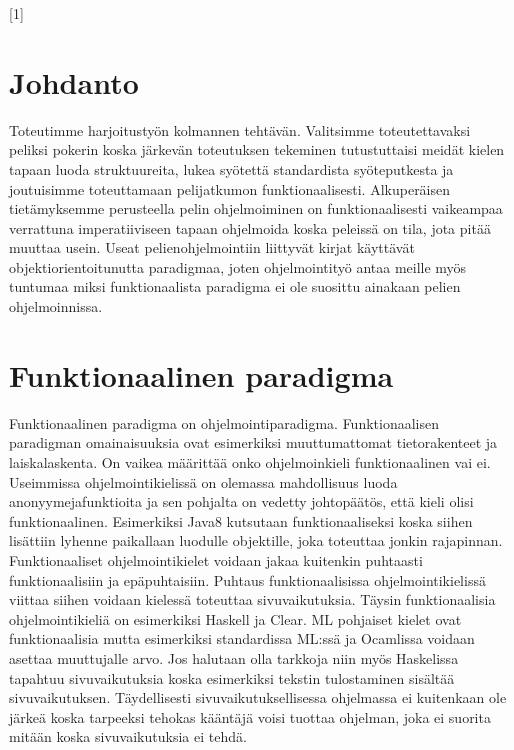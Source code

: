 \documentclass[12pt]{article}
\begin{document}
[1]
{}
{}
% 

\maketitle
\section{Johdanto}
Toteutimme harjoitustyön kolmannen tehtävän.
Valitsimme toteutettavaksi peliksi pokerin koska järkevän toteutuksen tekeminen tutustuttaisi meidät kielen tapaan luoda struktuureita,
lukea syötettä standardista syöteputkesta ja joutuisimme toteuttamaan pelijatkumon funktionaalisesti. Alkuperäisen tietämyksemme perusteella pelin ohjelmoiminen on funktionaalisesti vaikeampaa verrattuna imperatiiviseen tapaan ohjelmoida koska peleissä on tila, jota pitää muuttaa usein. Useat pelienohjelmointiin liittyvät kirjat käyttävät objektiorientoitunutta paradigmaa, joten ohjelmointityö antaa meille myös tuntumaa miksi funktionaalista paradigma ei ole suosittu ainakaan pelien ohjelmoinnissa.

\section{Funktionaalinen paradigma}
Funktionaalinen paradigma on ohjelmointiparadigma. Funktionaalisen paradigman omainaisuuksia ovat esimerkiksi muuttumattomat tietorakenteet ja laiskalaskenta.
On vaikea määrittää onko ohjelmoinkieli funktionaalinen vai ei. Useimmissa ohjelmointikielissä on olemassa mahdollisuus luoda anonyymejafunktioita ja sen pohjalta on vedetty johtopäätös, että kieli olisi funktionaalinen. Esimerkiksi Java8 kutsutaan funktionaaliseksi koska siihen lisättiin lyhenne paikallaan luodulle objektille, joka toteuttaa jonkin rajapinnan.
Funktionaaliset ohjelmointikielet voidaan jakaa kuitenkin puhtaasti funktionaalisiin ja epäpuhtaisiin. Puhtaus funktionaalisissa ohjelmointikielissä viittaa siihen voidaan kielessä toteuttaa sivuvaikutuksia. 
Täysin funktionaalisia ohjelmointikieliä on esimerkiksi Haskell ja Clear. ML pohjaiset kielet ovat funktionaalisia mutta esimerkiksi standardissa ML:ssä ja Ocamlissa voidaan asettaa muuttujalle arvo.
Jos halutaan olla tarkkoja niin myös Haskelissa tapahtuu sivuvaikutuksia koska esimerkiksi tekstin tulostaminen sisältää sivuvaikutuksen. Täydellisesti sivuvaikutuksellisessa ohjelmassa ei kuitenkaan ole järkeä koska tarpeeksi tehokas kääntäjä voisi tuottaa ohjelman, joka ei suorita mitään koska sivuvaikutuksia ei tehdä.
\end{document}
